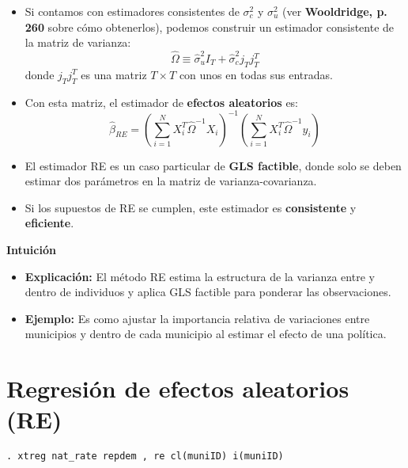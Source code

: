 \documentclass[12pt]{article}
\begin{document}
\begin{itemize}
    \item Si contamos con estimadores consistentes de $\sigma_c^2$ y $\sigma_u^2$  
    (ver \textbf{Wooldridge, p. 260} sobre cómo obtenerlos), podemos construir un estimador consistente de la matriz de varianza:
    \[
    \hat{\Omega} \equiv \hat{\sigma}_u^2 I_T + \hat{\sigma}_c^2 j_T j_T^T
    \]
    donde $j_T j_T^T$ es una matriz $T \times T$ con unos en todas sus entradas.
    
    \item Con esta matriz, el estimador de \textbf{efectos aleatorios} es:
    \[
    \hat{\beta}_{RE} 
    = \left( \sum_{i=1}^N X_i^T \hat{\Omega}^{-1} X_i \right)^{-1} 
      \left( \sum_{i=1}^N X_i^T \hat{\Omega}^{-1} y_i \right)
    \]
    
    \item El estimador RE es un caso particular de \textbf{GLS factible}, donde solo se deben estimar dos parámetros en la matriz de varianza-covarianza.
    
    \item Si los supuestos de RE se cumplen, este estimador es \textbf{consistente} y \textbf{eficiente}.
\end{itemize}

\noindent\textbf{Intuición}
\begin{itemize}
    \item \textbf{Explicación:} El método RE estima la estructura de la varianza entre y dentro de individuos y aplica GLS factible para ponderar las observaciones.
    \item \textbf{Ejemplo:} Es como ajustar la importancia relativa de variaciones entre municipios y dentro de cada municipio al estimar el efecto de una política.
\end{itemize}

\section*{\noindent\textbf{Regresión de efectos aleatorios (RE)}}

\begin{verbatim}
. xtreg nat_rate repdem , re cl(muniID) i(muniID)
\end{verbatim}
\end{document}
